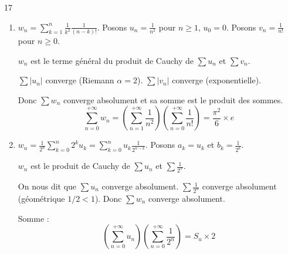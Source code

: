 \begin{correction}{17}
\begin{enumerate}
    \item $\displaystyle w_n = \sum_{k=1}^n \frac{1}{k^2} \frac{1}{(n-k)!}$.
        Posons $u_n = \frac{1}{n^2}$ pour $n \ge 1$, $u_0=0$.
        Posons $v_n = \frac{1}{n!}$ pour $n \ge 0$.

        $w_n$ est le terme général du produit de Cauchy de $\sum u_n$ et $\sum v_n$.
        
        $\sum |u_n|$ converge (Riemann $\alpha=2$).
        $\sum |v_n|$ converge (exponentielle).

        Donc $\sum w_n$ converge absolument et sa somme est le produit des sommes.
        $$\sum_{n=0}^{+\infty} w_n = \left(\sum_{n=1}^{+\infty} \frac{1}{n^2}\right) \left(\sum_{n=0}^{+\infty} \frac{1}{n!}\right) = \frac{\pi^2}{6} \times e$$

    \item $\displaystyle w_n = \frac{1}{2^n} \sum_{k=0}^n 2^k u_k = \sum_{k=0}^n u_k \frac{1}{2^{n-k}}$.
        Posons $a_k = u_k$ et $b_k = \frac{1}{2^k}$.

        $w_n$ est le produit de Cauchy de $\sum u_n$ et $\sum \frac{1}{2^n}$.

        On nous dit que $\sum u_n$ converge absolument.
        $\sum \frac{1}{2^n}$ converge absolument (géométrique $1/2 < 1$).
        Donc $\sum w_n$ converge absolument.

        Somme :
        $$\left(\sum_{n=0}^{+\infty} u_n\right) \left(\sum_{n=0}^{+\infty} \frac{1}{2^n}\right) = S_u \times 2$$
\end{enumerate}
\end{correction}
